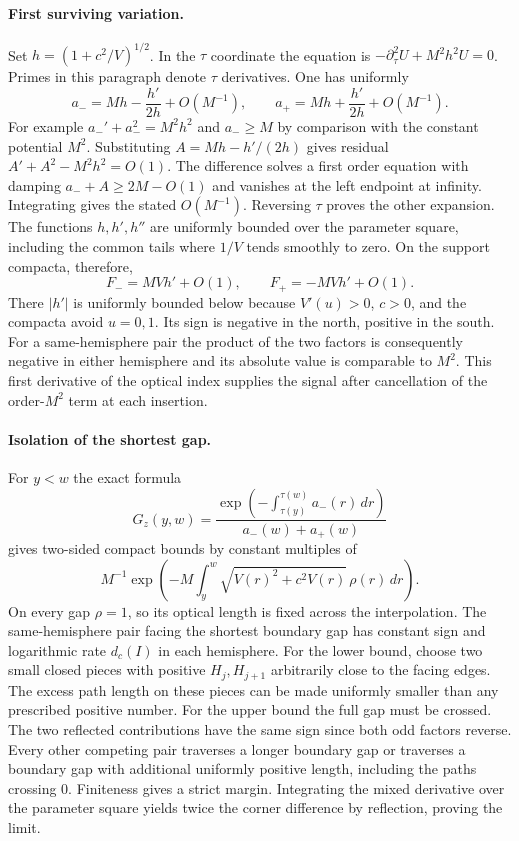 \documentclass[11pt,letterpaper]{article}
\begin{document}
\paragraph{First surviving variation.}
Set $h=(1+c^2/V)^{1/2}$. In the $\tau$ coordinate the equation is $-\partial_\tau^2 U+M^2h^2U=0$. Primes in this paragraph denote $\tau$ derivatives. One has uniformly
\[
 a_-=Mh-\frac{h'}{2h}+O(M^{-1}),\qquad
 a_+=Mh+\frac{h'}{2h}+O(M^{-1}).
\]
For example $a_-'+a_-^2=M^2h^2$ and $a_-\ge M$ by comparison with the constant potential $M^2$. Substituting $A=Mh-h'/(2h)$ gives residual $A'+A^2-M^2h^2=O(1)$. The difference solves a first order equation with damping $a_-+A\ge 2M-O(1)$ and vanishes at the left endpoint at infinity. Integrating gives the stated $O(M^{-1})$. Reversing $\tau$ proves the other expansion. The functions $h,h',h''$ are uniformly bounded over the parameter square, including the common tails where $1/V$ tends smoothly to zero. On the support compacta, therefore,
\[
 F_-= M V h'+O(1),\qquad F_+=- M V h'+O(1).
\]
There $|h'|$ is uniformly bounded below because $V'(u)>0$, $c>0$, and the compacta avoid $u=0,1$. Its sign is negative in the north, positive in the south. For a same-hemisphere pair the product of the two factors is consequently negative in either hemisphere and its absolute value is comparable to $M^2$. This first derivative of the optical index supplies the signal after cancellation of the order-$M^2$ term at each insertion.

\paragraph{Isolation of the shortest gap.}
For $y<w$ the exact formula
\[
 G_z(y,w)=\frac{\exp(-\int_{\tau(y)}^{\tau(w)} a_-(r)\,dr)}
                  {a_-(w)+a_+(w)}
\]
gives two-sided compact bounds by constant multiples of
\[
 M^{-1}\exp\!\left(-M\int_y^w\sqrt{V(r)^2+c^2V(r)}\,\rho(r)\,dr\right).
\]
On every gap $\rho=1$, so its optical length is fixed across the interpolation. The same-hemisphere pair facing the shortest boundary gap has constant sign and logarithmic rate $d_c(I)$ in each hemisphere. For the lower bound, choose two small closed pieces with positive $H_j,H_{j+1}$ arbitrarily close to the facing edges. The excess path length on these pieces can be made uniformly smaller than any prescribed positive number. For the upper bound the full gap must be crossed. The two reflected contributions have the same sign since both odd factors reverse. Every other competing pair traverses a longer boundary gap or traverses a boundary gap with additional uniformly positive length, including the paths crossing $0$. Finiteness gives a strict margin. Integrating the mixed derivative over the parameter square yields twice the corner difference by reflection, proving the limit.
\end{document}
